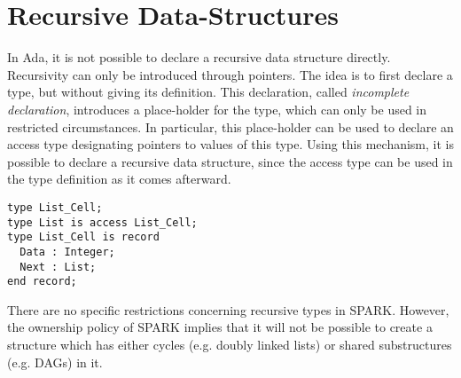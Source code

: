 \documentclass[runningheads]{llncs}
\begin{document}
\section{Recursive Data-Structures}
In Ada, it is not possible to declare a recursive data structure directly. Recursivity can only be introduced through pointers. The idea is to first declare a type, but without giving its definition. This declaration, called \emph{incomplete declaration}, introduces a place-holder for the type, which can only be used in restricted circumstances. In particular, this place-holder can be used to declare an access type designating pointers to values of this type. %
Using this mechanism, it is possible to declare a recursive data structure, since the access type can be used in the type definition as it comes afterward.
\begin{lstlisting}
type List_Cell;
type List is access List_Cell;
type List_Cell is record
  Data : Integer;
  Next : List;
end record;
\end{lstlisting}
There are no specific restrictions concerning recursive types in SPARK. However, the ownership policy of SPARK implies that it will not be possible to create a structure which has either cycles (e.g. doubly linked lists) or shared substructures (e.g. DAGs) in it.
\end{document}
